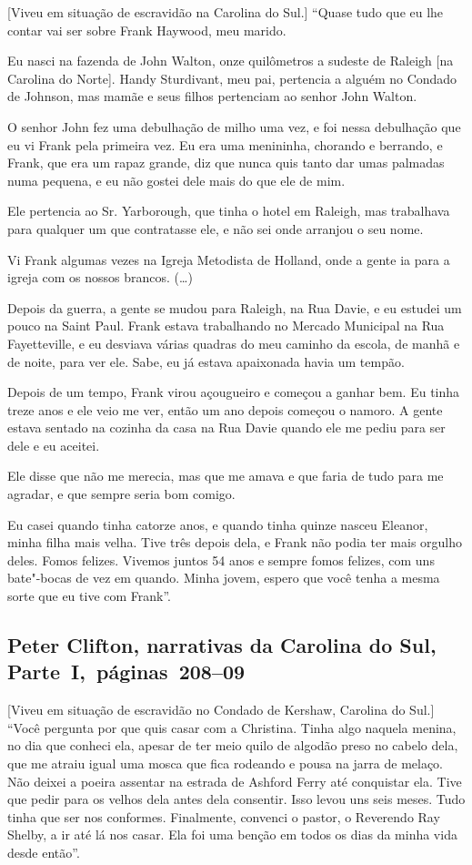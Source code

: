 {[}Viveu em situação de escravidão na Carolina do Sul.{]} ``Quase tudo que eu lhe contar vai ser sobre Frank Haywood, meu marido.

Eu nasci na fazenda de John Walton, onze quilômetros a sudeste de
Raleigh {[}na Carolina do Norte{]}. Handy Sturdivant, meu pai, pertencia
a alguém no Condado de Johnson, mas mamãe e seus filhos pertenciam ao
senhor John Walton.

O senhor John fez uma debulhação de milho uma vez, e foi nessa
debulhação que eu vi Frank pela primeira vez. Eu era uma menininha,
chorando e berrando, e Frank, que era um rapaz grande, diz que nunca
quis tanto dar umas palmadas numa pequena, e eu não gostei dele mais do
que ele de mim.

Ele pertencia ao Sr. Yarborough, que tinha o hotel em Raleigh, mas
trabalhava para qualquer um que contratasse ele, e não sei onde arranjou
o seu nome.

Vi Frank algumas vezes na Igreja Metodista de Holland, onde a gente ia
para a igreja com os nossos brancos. (\ldots{})

Depois da guerra, a gente se mudou para Raleigh, na Rua Davie, e eu
estudei um pouco na Saint Paul. Frank estava trabalhando no Mercado
Municipal na Rua Fayetteville, e eu desviava várias quadras do meu
caminho da escola, de manhã e de noite, para ver ele. Sabe, eu já estava
apaixonada havia um tempão.

Depois de um tempo, Frank virou açougueiro e começou a ganhar bem. Eu
tinha treze anos e ele veio me ver, então um ano depois começou o
namoro. A gente estava sentado na cozinha da casa na Rua Davie quando
ele me pediu para ser dele e eu aceitei.

Ele disse que não me merecia, mas que me amava e que faria de tudo para
me agradar, e que sempre seria bom comigo.

Eu casei quando tinha catorze anos, e quando tinha quinze nasceu
Eleanor, minha filha mais velha. Tive três depois dela, e Frank não
podia ter mais orgulho deles. Fomos felizes. Vivemos juntos 54 anos e
sempre fomos felizes, com uns bate"-bocas de vez em quando. Minha jovem,
espero que você tenha a mesma sorte que eu tive com Frank''.

\subsection{Peter Clifton, narrativas da Carolina do Sul, Parte~I,~páginas~208--09}

{[}Viveu em situação de escravidão no Condado de Kershaw, Carolina do Sul.{]} ``Você pergunta por que quis casar com a Christina. Tinha algo naquela
menina, no dia que conheci ela, apesar de ter meio quilo de algodão
preso no cabelo dela, que me atraiu igual uma mosca que fica rodeando e
pousa na jarra de melaço. Não deixei a poeira assentar na estrada de
Ashford Ferry até conquistar ela. Tive que pedir para os velhos dela
antes dela consentir. Isso levou uns seis meses. Tudo tinha que ser nos
conformes. Finalmente, convenci o pastor, o Reverendo Ray Shelby, a ir
até lá nos casar. Ela foi uma benção em todos os dias da minha vida
desde então''.

